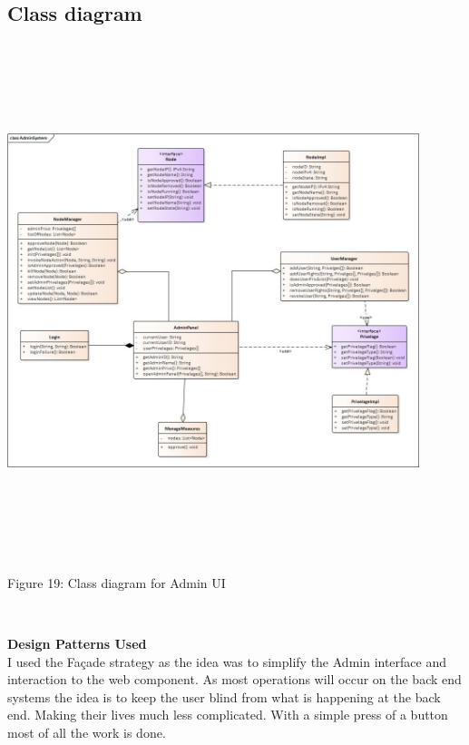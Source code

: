 \subsection{Class diagram}
 \includegraphics[width=12cm,height=15cm,keepaspectratio]{admin_ui/images/AdminSystem.jpg}
	\begin{center}
	    \small{Figure 19: Class diagram for Admin UI}
    \end{center}\\
    \par \textbf{Design Patterns Used} \\
    I used the Façade strategy as the idea was to simplify the Admin interface and interaction to the web component. As most operations will occur on the back end systems the idea is to keep the user blind from what is happening at the back end. Making their lives much less complicated. With a simple press of a button most of all the work is done. 
	
	
		
